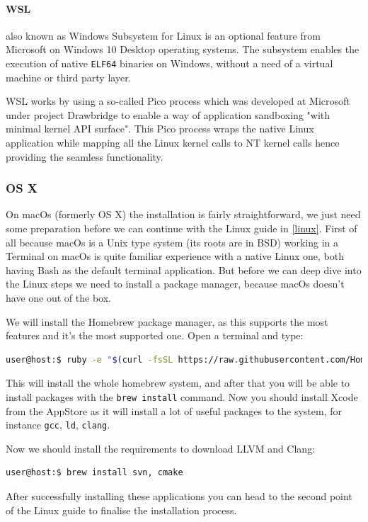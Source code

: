 \paragraph{WSL}
\par also known as Windows Subsystem for Linux is an optional feature from Microsoft on Windows 10 Desktop operating systems. The subsystem enables the execution of native \verb|ELF64| binaries\cite{wsl_overview} on Windows, without a need of a virtual machine or third party layer. \medskip
\par WSL works by using a so-called Pico process which was developed at Microsoft under project Drawbridge\cite{project_drawbridge} to enable a way of application sandboxing "with minimal kernel API surface"\cite{project_drawbridge}. This Pico process wraps the native Linux application while mapping all the Linux kernel calls to NT kernel calls hence providing the seamless functionality. 
\par 
\subsubsection{OS X}
\par On macOs (formerly OS X) the installation is fairly straightforward, we just need some preparation before we can continue with the Linux guide in \ref{linux}. First of all because macOs is a Unix type system (its roots are in BSD) working in a Terminal on macOs is quite familiar experience with a native Linux one, both having Bash as the default terminal application. But before we can deep dive into the Linux steps we need to install a package manager, because macOs doesn't have one out of the box.
\par We will install the Homebrew\cite{homebrew_homepage} package manager, as this supports the most features and it's the most supported one. Open a terminal and type: 
\begin{lstlisting}[language=bash, frame=single]
user@host:$ ruby -e "$(curl -fsSL https://raw.githubusercontent.com/Homebrew/install/master/install)"
\end{lstlisting}
\par This will install the whole homebrew system, and after that you will be able to install packages with the \verb|brew install| command. Now you should install Xcode from the AppStore as it will install a lot of useful packages to the system, for instance \verb|gcc|, \verb|ld|, \verb|clang|.
\par Now we should install the requirements to download LLVM and Clang:
\begin{lstlisting}[language=bash, frame=single]
user@host:$ brew install svn, cmake
\end{lstlisting}
\par After successfully installing these applications you can head to the second point of the Linux guide to finalise the installation process.
